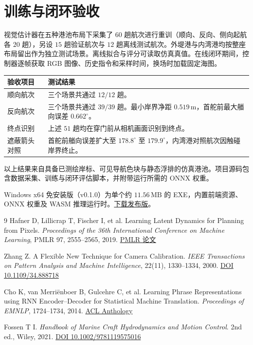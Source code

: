 \documentclass[a4paper,UTF8,fontset=fandol,zihao=-4]{ctexart}
\begin{document}
\newpage
\section{训练与闭环验收}

视觉估计器在五种港池布局下采集了 \(60\) 趟航次进行重训（顺向、反向、侧向起航各 \(20\) 趟），另设 \(15\) 趟验证航次与 \(12\) 趟离线测试航次。外堤港与内湾港均按整座布局留出作为独立测试场景。离线拟合与评分可读取仿真真值。在线闭环期间，控制器逐帧获取 RGB 图像、历史指令和采样时间，换场时加载固定海图。

\noindent\begin{tabularx}{\linewidth}{@{}p{43mm}X@{}}
  \toprule
  验收项目 & 测试结果 \\
  \midrule
  顺向航次 & 三个场景共通过 \(12/12\) 趟。\\
  反向航次 & 三个场景共通过 \(39/39\) 趟。最小岸界净距 \(0.519\,\mathrm{m}\)，首舵前最大艏向误差 \(0.662^\circ\)。\\
  终点识别 & 上述 \(51\) 趟均在穿门前从相机画面识别到终点。\\
  遮蔽箭头对照 & 首舵前艏向误差扩大至 \(178.8^\circ\) 至 \(179.9^\circ\)，内湾港对照航次因触碰岸界终止。\\
  \bottomrule
\end{tabularx}

以上结果来自具备已测绘岸标、可见导航色块与静态浮排的仿真港池。项目源码包含数据采集、训练与闭环评估脚本，并附带运行所需的 ONNX 权重。

Windows x64 免安装版（v0.1.0）为单个约 \(11.56\,\mathrm{MB}\) 的 EXE，内置前端资源、ONNX 权重及 WASM 推理运行时。\href{https://github.com/ZHT1235456/USV-world-model-demo/releases/tag/v0.1.0}{下载发布版}。

\begin{thebibliography}{9}
\small
{}
Hafner D, Lillicrap T, Fischer I, et al.
Learning Latent Dynamics for Planning from Pixels.
\emph{Proceedings of the 36th International Conference on Machine Learning},
PMLR 97, 2555--2565, 2019.
\href{https://proceedings.mlr.press/v97/hafner19a.html}{PMLR 论文}

Zhang Z. A Flexible New Technique for Camera Calibration.
\emph{IEEE Transactions on Pattern Analysis and Machine Intelligence},
22(11), 1330--1334, 2000.
\href{https://doi.org/10.1109/34.888718}{DOI 10.1109/34.888718}

Cho K, van Merri\"enboer B, Gulcehre C, et al.
Learning Phrase Representations using RNN Encoder--Decoder for Statistical Machine Translation.
\emph{Proceedings of EMNLP}, 1724--1734, 2014.
\href{https://aclanthology.org/D14-1179/}{ACL Anthology}

Fossen T I. \emph{Handbook of Marine Craft Hydrodynamics and Motion Control}.
2nd ed., Wiley, 2021.
\href{https://doi.org/10.1002/9781119575016}{DOI 10.1002/9781119575016}
\end{thebibliography}
\end{document}
